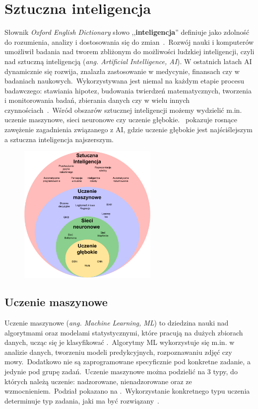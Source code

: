 \chapter{Sztuczna inteligencja}
Słownik \textit{Oxford English Dictionary} słowo ,,\textbf{inteligencja}'' definiuje jako zdolność do rozumienia, analizy i dostosowania się do zmian~\cite{OxfordJuly2023}.\ Rozwój nauki i komputerów umożliwił badania nad tworem zbliżonym do możliwości ludzkiej inteligencji, czyli nad sztuczną inteligencją (\textit{ang. Artificial Intelligence, AI}). W ostatnich latach AI dynamicznie się rozwija, znalazła zastosowanie w medycynie, finansach czy w badaniach naukowych.\ Wykorzystywana jest niemal na każdym etapie procesu badawczego: stawiania hipotez, budowania twierdzeń matematycznych, tworzenia i monitorowania badań, zbierania danych czy w wielu innych czynnościach~\cite{AiScience, Mahesh2018}.\ Wśród obszarów sztucznej inteligencji możemy wydzielić m.in. uczenie maszynowe, sieci neuronowe czy uczenie głębokie.\  pokazuje rosnące zawężenie zagadnienia związanego z AI, gdzie uczenie głębokie jest najściślejszym a sztuczna inteligencja najszerszym.

\begin{figure}[H]
    \centering
    \includegraphics[width=0.6\textwidth]{images/si}
    \label{fig:si-schema}
\end{figure}


\section{Uczenie maszynowe}
Uczenie maszynowe (\textit {ang. Machine Learning, ML}) to dziedzina nauki nad algorytmami oraz modelami statystycznymi, które pracują na dużych zbiorach danych, ucząc się je klasyfikować .\ Algorytmy ML wykorzystuje się m.in. w analizie danych, tworzeniu modeli predykcyjnych, rozpoznawaniu zdjęć czy mowy.\ Dodatkowo nie są zaprogramowane specyficznie pod konkretne zadanie, a jedynie pod grupę zadań.\ Uczenie maszynowe można podzielić na 3 typy, do których należą uczenie: nadzorowane, nienadzorowane oraz ze wzmocnieniem.\ Podział  pokazano na .\ Wykorzystanie konkretnego typu uczenia determinuje typ zadania, jaki ma być rozwiązany~\cite{Mahesh2018, LinkedInSi}.

